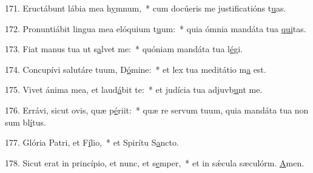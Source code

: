 171. Eructábunt lábia mea h\uline{y}mnum,~* cum docúeris me justificatións t\uline{u}as.\par 
172. Pronuntiábit lingua mea elóquium t\uline{u}um:~* quia ómnia mandáta tua \uline{qui}tas.\par 
173. Fiat manus tua ut s\uline{a}lvet me:~* quóniam mandáta tua l\uline{é}gi.\par 
174. Concupívi salutáre tuum, D\uline{ó}mine:~* et lex tua meditátio m\uline{a} est.\par 
175. Vivet ánima mea, et laud\uline{á}bit te:~* et judícia tua adjuvb\uline{u}nt me.\par 
176. Errávi, sicut ovis, quæ p\uline{é}riit:~* quæ re servum tuum, quia mandáta tua non sum bl\uline{í}tus.\par 
177. Glória Patri, et F\uline{í}lio,~* et Spirítu S\uline{a}ncto.\par 
178. Sicut erat in princípio, et nunc, et s\uline{e}mper,~* et in sǽcula sæculórm. \uline{A}men.\par 
